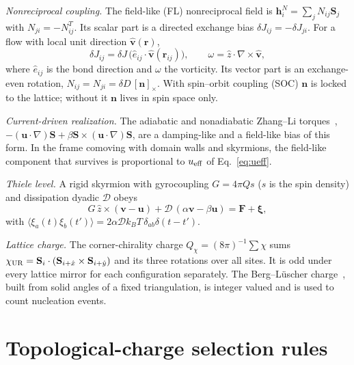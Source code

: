 \documentclass[aps,prb,twocolumn,superscriptaddress,longbibliography,floatfix]{revtex4-2}
\newcommand{\vS}{\mathbf S}
\newcommand{\vh}{\mathbf h}
\newcommand{\vu}{\mathbf u}
\newcommand{\vv}{\mathbf v}
\newcommand{\vr}{\mathbf r}
\newcommand{\ueff}{u_{\rm eff}}
\newcommand{\kT}{k_BT}
\newcommand{\avg}[1]{\langle #1\rangle}
\begin{document}
\emph{Nonreciprocal coupling.} The field-like (FL) nonreciprocal field is $\vh^N_i=\sum_jN_{ij}\vS_j$ with $N_{ji}=-N_{ij}^{T}$. Its scalar part is a directed exchange bias $\delta J_{ij}=-\delta J_{ji}$. For a flow with local unit direction $\hat{\vv}(\vr)$,
\begin{equation}
\delta J_{ij}=\delta J\,\big(\hat e_{ij}\cdot\hat{\vv}(\vr_{ij})\big),\qquad \omega=\hat z\cdot\nabla\times\hat{\vv},
\label{eq:dJ}
\end{equation}
where $\hat e_{ij}$ is the bond direction and $\omega$ the vorticity. Its vector part is an exchange-even rotation, $N_{ij}=N_{ji}=\delta D\,[\mathbf n]_\times$. With spin--orbit coupling (SOC) $\mathbf n$ is locked to the lattice; without it $\mathbf n$ lives in spin space only.

\emph{Current-driven realization.} The adiabatic and nonadiabatic Zhang--Li torques~\cite{ZhangLi2004,Thiaville2005}, $-(\vu\cdot\nabla)\vS+\beta\vS\times(\vu\cdot\nabla)\vS$, are a damping-like and a field-like bias of this form. In the frame comoving with domain walls and skyrmions, the field-like component that survives is proportional to $\ueff$ of Eq.~\eqref{eq:ueff}.

\emph{Thiele level.} A rigid skyrmion with gyrocoupling $G=4\pi Qs$ ($s$ is the spin density) and dissipation dyadic $\mathcal D$ obeys~\cite{Thiele1973}
\begin{equation}
G\,\hat z\times(\vv-\vu)+\mathcal D\,(\alpha\vv-\beta\vu)=\mathbf F+\bm\xi,
\label{eq:thiele}
\end{equation}
with $\avg{\xi_a(t)\xi_b(t')}=2\alpha\mathcal D\kT\,\delta_{ab}\delta(t-t')$.

\emph{Lattice charge.} The corner-chirality charge $Q_\chi=(8\pi)^{-1}\sum\chi$ sums $\chi_{\rm UR}=\vS_i\cdot(\vS_{i+\hat x}\times\vS_{i+\hat y})$ and its three rotations over all sites. It is odd under every lattice mirror for each configuration separately. The Berg--L\"uscher charge~\cite{BergLuscher1981}, built from solid angles of a fixed triangulation, is integer valued and is used to count nucleation events.

\section{Topological-charge selection rules}\label{sec:symmetry}
\end{document}
